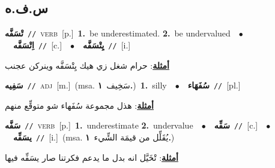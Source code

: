 \documentclass[10pt,a4paper,twoside]{article} %
\begin{document}
\begin{multicols}{2}
\vspace{-3mm}
\subsection*{\color{blue}\foreignlanguage{arabic}{س.ف.ه}\color{blue}{}} 

{\setlength\topsep{0pt}\textbf{\foreignlanguage{arabic}{تْسَفَّه}}\ {\color{gray}\texttt{//}\color{black}}\ \textsc{verb}\ [p.]\ \textbf{1.}~be underestimated.  \textbf{2.}~be undervalued\ \ $\bullet$\ \ \setlength\topsep{0pt}\textbf{\foreignlanguage{arabic}{اِتْسَفَّه}}\ {\color{gray}\texttt{//}\color{black}}\ [c.]\ \ $\bullet$\ \ \setlength\topsep{0pt}\textbf{\foreignlanguage{arabic}{يِتْسَفَّه}}\ {\color{gray}\texttt{//}\color{black}}\ [i.]\  \begin{flushright}\color{gray}\foreignlanguage{arabic}{\textbf{\underline{\foreignlanguage{arabic}{أمثلة}}}: حرام شغل زي هيك يِتْسَفَّه وينركن عجنب}\end{flushright}\color{black}} \vspace{2mm}

{\setlength\topsep{0pt}\textbf{\foreignlanguage{arabic}{سَفِيه}}\ {\color{gray}\texttt{//}\color{black}}\ \textsc{adj}\ [m.]\ \color{gray}(msa. \foreignlanguage{arabic}{سَخِيف}~\foreignlanguage{arabic}{\textbf{١.}})\color{black}\ \textbf{1.}~silly\ \ $\bullet$\ \ \setlength\topsep{0pt}\textbf{\foreignlanguage{arabic}{سُفَهَاء}}\ {\color{gray}\texttt{//}\color{black}}\ [pl.]\  \begin{flushright}\color{gray}\foreignlanguage{arabic}{\textbf{\underline{\foreignlanguage{arabic}{أمثلة}}}: هذل مجموعة سُفَهاء شو متوقِّع منهم}\end{flushright}\color{black}} \vspace{2mm}

{\setlength\topsep{0pt}\textbf{\foreignlanguage{arabic}{سَفَّه}}\ {\color{gray}\texttt{//}\color{black}}\ \textsc{verb}\ [p.]\ \textbf{1.}~underestimate  \textbf{2.}~undervalue\ \ $\bullet$\ \ \setlength\topsep{0pt}\textbf{\foreignlanguage{arabic}{سَفِّه}}\ {\color{gray}\texttt{//}\color{black}}\ [c.]\ \ $\bullet$\ \ \setlength\topsep{0pt}\textbf{\foreignlanguage{arabic}{يسَفِّه}}\ {\color{gray}\texttt{//}\color{black}}\ [i.]\ \color{gray}(msa. \foreignlanguage{arabic}{يُقَلِّل من قيمَة الشِّيء}~\foreignlanguage{arabic}{\textbf{١.}})\color{black}\  \begin{flushright}\color{gray}\foreignlanguage{arabic}{\textbf{\underline{\foreignlanguage{arabic}{أمثلة}}}: تْخَيَّل انه بدل ما يدعم فكرتنا صار يسَفِّه فيها}\end{flushright}\color{black}} \vspace{2mm}


\end{multicols}
\end{document}
